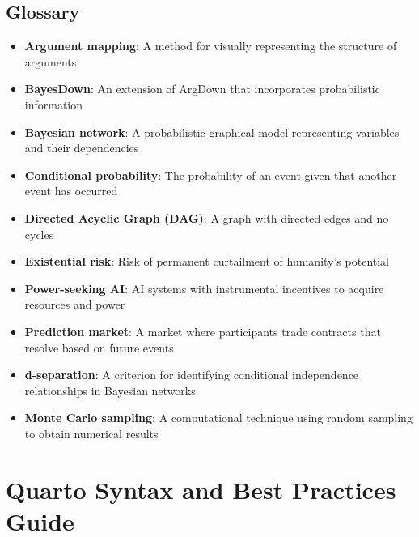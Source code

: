 \documentclass[
  11pt,
  letterpaper,
]{book}
\providecommand{\tightlist}{%
  \setlength{\itemsep}{0pt}\setlength{\parskip}{0pt}}
\begin{document}
\section*{Glossary}\label{glossary}


\begin{itemize}
\tightlist
\item
  \textbf{Argument mapping}: A method for visually representing the
  structure of arguments\\
\item
  \textbf{BayesDown}: An extension of ArgDown that incorporates
  probabilistic information\\
\item
  \textbf{Bayesian network}: A probabilistic graphical model
  representing variables and their dependencies\\
\item
  \textbf{Conditional probability}: The probability of an event given
  that another event has occurred\\
\item
  \textbf{Directed Acyclic Graph (DAG)}: A graph with directed edges and
  no cycles\\
\item
  \textbf{Existential risk}: Risk of permanent curtailment of humanity's
  potential\\
\item
  \textbf{Power-seeking AI}: AI systems with instrumental incentives to
  acquire resources and power\\
\item
  \textbf{Prediction market}: A market where participants trade
  contracts that resolve based on future events\\
\item
  \textbf{d-separation}: A criterion for identifying conditional
  independence relationships in Bayesian networks\\
\item
  \textbf{Monte Carlo sampling}: A computational technique using random
  sampling to obtain numerical results
\end{itemize}


\chapter*{Quarto Syntax and Best Practices
Guide}\label{quarto-syntax-and-best-practices-guide}
\end{document}
